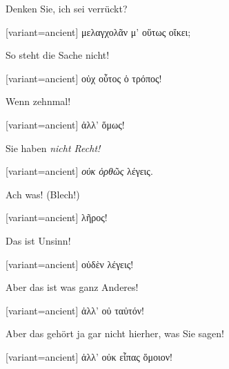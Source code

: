 Denken Sie, ich sei verrückt? 

\switchcolumn

\begin{greek}[variant=ancient]%
μελαγχολᾶν μ' οὕτως οἴκει;

\end{greek}%
\switchcolumn*

So steht die Sache nicht! 

\switchcolumn

\begin{greek}[variant=ancient]%
οὐχ οὗτος ὁ τρόπος!

\end{greek}%
\switchcolumn*

Wenn zehnmal! 

\switchcolumn

\begin{greek}[variant=ancient]%
ἀλλ' ὅμως!

\end{greek}%
\switchcolumn*

Sie haben \emph{nicht Recht!} 

\switchcolumn

\begin{greek}[variant=ancient]%
\emph{οὐκ ὀρθῶς} λέγεις.

\end{greek}%
\switchcolumn*

Ach was! (Blech!) 

\switchcolumn

\begin{greek}[variant=ancient]%
λῆρος!

\end{greek}%
\switchcolumn*

Das ist Unsinn! 

\switchcolumn

\begin{greek}[variant=ancient]%
οὐδὲν λέγεις!

\end{greek}%
\switchcolumn*

Aber das ist was ganz Anderes! 

\switchcolumn

\begin{greek}[variant=ancient]%
ἀλλ' οὐ ταὐτόν!

\end{greek}%
\switchcolumn*

Aber das gehört ja gar nicht hierher, was Sie sagen! 

\switchcolumn

\begin{greek}[variant=ancient]%
ἀλλ' οὐκ εἶπας ὅμοιον!

\end{greek}%
